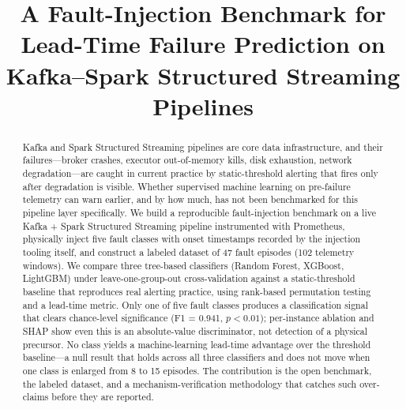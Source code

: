 \documentclass[conference]{IEEEtran}
\begin{document}
\title{A Fault-Injection Benchmark for Lead-Time Failure Prediction on Kafka--Spark Structured Streaming Pipelines}

\author{
\and
{}
\and
{}
}

\maketitle

\begin{abstract}
Kafka and Spark Structured Streaming pipelines are core data infrastructure, and their failures---broker crashes, executor out-of-memory kills, disk exhaustion, network degradation---are caught in current practice by static-threshold alerting that fires only after degradation is visible. Whether supervised machine learning on pre-failure telemetry can warn earlier, and by how much, has not been benchmarked for this pipeline layer specifically. We build a reproducible fault-injection benchmark on a live Kafka + Spark Structured Streaming pipeline instrumented with Prometheus, physically inject five fault classes with onset timestamps recorded by the injection tooling itself, and construct a labeled dataset of 47 fault episodes (102 telemetry windows). We compare three tree-based classifiers (Random Forest, XGBoost, LightGBM) under leave-one-group-out cross-validation against a static-threshold baseline that reproduces real alerting practice, using rank-based permutation testing and a lead-time metric. Only one of five fault classes produces a classification signal that clears chance-level significance (F1 = 0.941, $p < 0.01$); per-instance ablation and SHAP show even this is an absolute-value discriminator, not detection of a physical precursor. No class yields a machine-learning lead-time advantage over the threshold baseline---a null result that holds across all three classifiers and does not move when one class is enlarged from 8 to 15 episodes. The contribution is the open benchmark, the labeled dataset, and a mechanism-verification methodology that catches such over-claims before they are reported.
\end{abstract}
\end{document}
